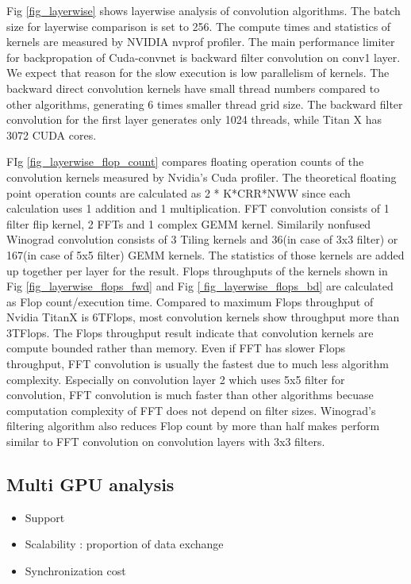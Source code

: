Fig \ref{fig_layerwise} shows layerwise analysis of convolution algorithms.
The batch size for layerwise comparison is set to 256.
The compute times and statistics of kernels are measured by NVIDIA nvprof profiler.
The main performance limiter for backpropation of Cuda-convnet is backward filter convolution on conv1 layer.
We expect that reason for the slow execution is low parallelism of kernels.
The backward direct convolution kernels have small thread numbers compared to other algorithms, generating 6 times smaller thread grid size.
The backward filter convolution for the first layer generates only 1024 threads, while Titan X has 3072 CUDA cores.

FIg \ref{fig_layerwise_flop_count} compares floating operation counts of the convolution kernels measured by Nvidia's Cuda profiler.
The theoretical floating point operation counts are calculated as 2 * K*CRR*NWW since each calculation uses 1 addition and 1 multiplication.
FFT convolution consists of 1 filter flip kernel, 2 FFTs and 1 complex GEMM kernel.
Similarily nonfused Winograd convolution consists of 3 Tiling kernels and 36(in case of 3x3 filter) or 167(in case of 5x5 filter) GEMM kernels.
The statistics of those kernels are added up together per layer for the result.
Flops throughputs of the kernels shown in Fig \ref{fig_layerwise_flops_fwd} and Fig \ref{ fig_layerwise_flops_bd} are calculated as Flop count/execution time.
Compared to maximum Flops throughput of Nvidia TitanX is 6TFlops, most convolution kernels show throughput more than 3TFlops.
The Flops throughput result indicate that convolution kernels are compute bounded rather than memory.
Even if FFT has slower Flops throughput, FFT convolution is usually the fastest due to much less algorithm complexity.
Especially on convolution layer 2 which uses 5x5 filter for convolution, FFT convolution is much faster than other algorithms becuase computation complexity of FFT does not depend on filter sizes.
Winograd's filtering algorithm also reduces Flop count by more than half makes perform similar to FFT convolution on convolution layers with 3x3 filters.

\subsection{Multi GPU analysis}

\begin{itemize}
  \item Support
  \item Scalability : proportion of data exchange
  \item Synchronization cost
\end{itemize}
